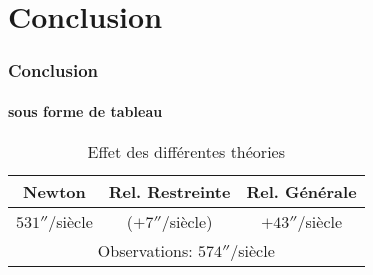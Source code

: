 \section{Conclusion}

\begin{frame}
\frametitle{Conclusion}
\framesubtitle{sous forme de tableau}

\begin{table}
\begin{tabular}{c c c}
\toprule
\textbf{Newton} & \textbf{Rel. Restreinte} & \textbf{Rel. Générale}\\
\midrule
$531''/$siècle & ($+7''/$siècle) & $+43''/$siècle \\
\midrule
\multicolumn{3}{c}{Observations: $574''/$siècle} \\
\bottomrule
\end{tabular}
\caption{Effet des différentes théories}
\end{table}

\end{frame}

